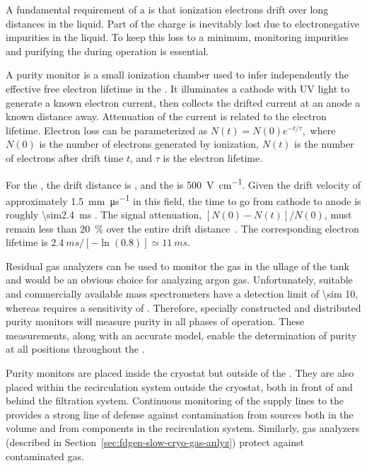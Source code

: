 A fundamental requirement of a  is that ionization electrons drift over long distances in the liquid. Part of the charge is inevitably lost due to electronegative impurities in the liquid. To keep this loss to a minimum, monitoring impurities and purifying the  during operation is essential.


A purity monitor is a small ionization chamber used to infer independently  the effective free electron lifetime in the .  
It illuminates a cathode with UV light to generate a known electron current, then collects the drifted current at an anode a known distance away.  Attenuation of the current is related to the electron lifetime.
Electron loss can be parameterized as
%
\(N(t) = N(0)e^{-t/\tau},\)
%
where $N(0)$ is the number of electrons generated by ionization, $N(t)$ is the number of electrons after drift time $t$, and $\tau$ is the electron lifetime. 


For the , the drift distance is \spmaxdrift, and the \efield is \SI{500}{\volt\per\centi\meter}. Given the drift velocity of approximately \SI{1.5}{\milli\meter\per\micro\second} in this field, the time to go from cathode to anode is roughly \SI{\sim2.4}{\milli\second} \cite{Walkowiak:2000wf}.
The  signal attenuation, \([N(0)-N(t)]/N(0)\), must remain %
less than \SI{20}{\percent} over the entire drift distance~\cite{bib:docdb3384}.  %
 The corresponding electron lifetime is $\SI{2.4}{ms}/[-\ln(0.8)] \simeq \SI{11}{ms}$.


Residual gas analyzers can be used to monitor the gas in the ullage of the tank and would be an obvious choice for analyzing argon gas. 
Unfortunately, suitable and commercially available mass
spectrometers have a detection limit of \SI{\sim 10}{},
whereas  requires a sensitivity of . Therefore,
specially constructed and distributed purity monitors will measure  purity in all %
phases of operation. %
These measurements,
along with an accurate  model, enable the
determination of purity at all positions throughout the .




Purity monitors are placed inside the cryostat but outside of the %
. They are also placed  within the recirculation system outside the cryostat, both in front of and behind the filtration system. %
Continuous monitoring of  the  supply lines to the  provides a strong line of defense against %
contamination from sources both in the  volume and from components in the recirculation system. 
Similarly, gas analyzers (described in Section~\ref{sec:fdgen-slow-cryo-gas-anlyz}) %
protect against contaminated gas.  

